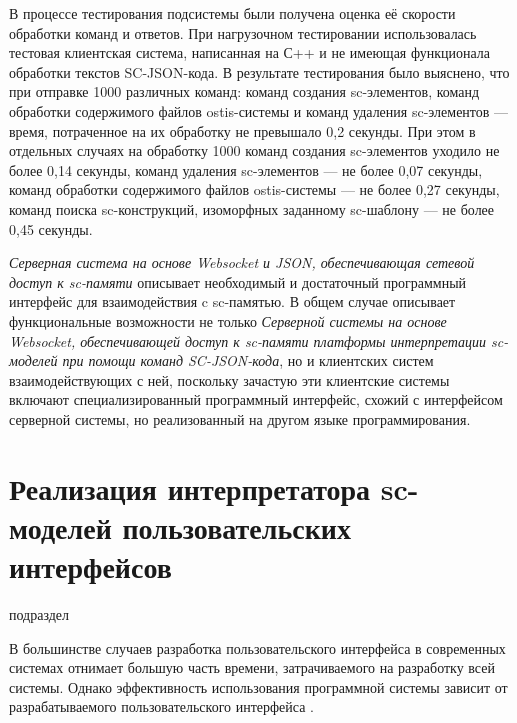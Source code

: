 \begin{textitemize}
    \item В процессе тестирования подсистемы были получена оценка её скорости обработки команд и ответов. При нагрузочном тестировании использовалась тестовая клиентская система, написанная на С++ и не имеющая функционала обработки текстов SC-JSON-кода. В результате тестирования было выяснено, что при отправке 1000 различных команд: команд создания sc-элементов, команд обработки содержимого файлов ostis-системы и команд удаления sc-элементов --- время, потраченное на их обработку не превышало 0,2 секунды. При этом в отдельных случаях на обработку 1000 команд создания sc-элементов уходило не более 0,14 секунды, команд удаления sc-элементов --- не более 0,07 секунды, команд обработки содержимого файлов ostis-системы --- не более 0,27 секунды, команд поиска sc-конструкций, изоморфных заданному sc-шаблону --- не более 0,45 секунды.
\end{textitemize}

\textit{Серверная система на основе Websocket и JSON, обеспечивающая сетевой доступ к sc-памяти} описывает необходимый и достаточный программный интерфейс для взаимодействия c sc-памятью. В общем случае описывает функциональные возможности не только \textit{Серверной системы на основе Websocket, обеспечивающей доступ к sc-памяти платформы интерпретации sc-моделей при помощи команд SC-JSON-кода}, но и клиентских систем взаимодействующих с ней, поскольку зачастую эти клиентские системы включают специализированный программный интерфейс, схожий с интерфейсом серверной системы, но реализованный на другом языке программирования.

\section{Реализация интерпретатора sc-моделей пользовательских интерфейсов}
\label{sec_soft_platform_sci_machine}

\begin{SCn}

\begin{scnrelfromlist}{подраздел}
\end{scnrelfromlist}

\end{SCn}

В большинстве случаев разработка пользовательского интерфейса в современных системах отнимает большую часть времени, затрачиваемого на разработку всей системы. Однако эффективность использования программной системы зависит от разрабатываемого пользовательского интерфейса .

